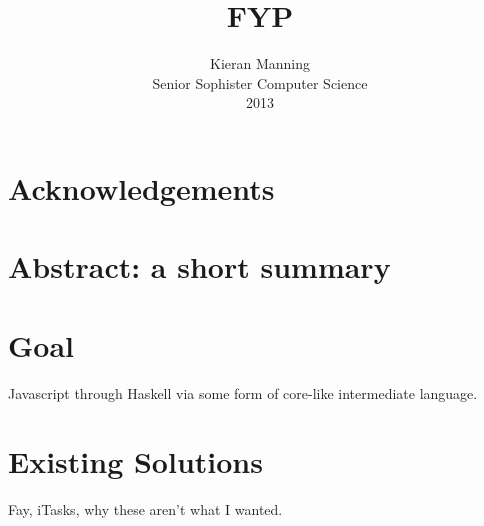 \documentclass[11pt]{article}
\title{\textbf{FYP }}
\author{Kieran Manning \\
		Senior Sophister Computer Science \\
		2013}
\date{}
\begin{document}
\maketitle

\tableofcontents

\section{Acknowledgements}

\section{Abstract: a short summary} 

\section{Goal}
Javascript through Haskell via some form of core-like intermediate language.

\section{Existing Solutions}
Fay, iTasks, why these aren't what I wanted.
\end{document}
